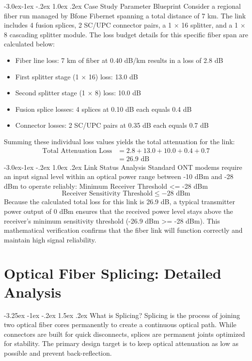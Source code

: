 \documentclass[11pt,a4paper]{report}
\makeatletter
\renewcommand{\section}{\@startsection{section}{1}{\z@}%
  {-3.25ex \@plus -1ex \@minus -.2ex}%
  {1.5ex \@plus.2ex}%
  {\normalfont\Large\bfseries\color{primaryColor}}}
\renewcommand{\subsection}{\@startsection{subsection}{2}{\z@}%
  {-3.0ex\@plus -1ex \@minus -.2ex}%
  {1.0ex \@plus .2ex}%
  {\normalfont\large\bfseries\color{secondaryColor}}}
\makeatother
\begin{document}
\subsection{Case Study Parameter Blueprint}
Consider a regional fiber run managed by Bfone Fibernet spanning a total distance of 7 km. The link includes 4 fusion splices, 2 SC/UPC connector pairs, a 1 $\times$ 16 splitter, and a 1 $\times$ 8 cascading splitter module. The loss budget details for this specific fiber span are calculated below:
\begin{itemize}
  \item Fiber line loss: 7 km of fiber at 0.40 dB/km results in a loss of 2.8 dB
  \item First splitter stage (1 $\times$ 16) loss: 13.0 dB
  \item Second splitter stage (1 $\times$ 8) loss: 10.0 dB
  \item Fusion splice losses: 4 splices at 0.10 dB each equals 0.4 dB
  \item Connector losses: 2 SC/UPC pairs at 0.35 dB each equals 0.7 dB
\end{itemize}
Summing these individual loss values yields the total attenuation for the link:
\begin{align*} \text{Total Attenuation Loss} &= 2.8 + 13.0 + 10.0 + 0.4 + 0.7 \\ &= 26.9\text{ dB} \end{align*}
\subsection{Link Status Analysis}
Standard ONT modems require an input signal level within an optical power range between -10 dBm and -28 dBm to operate reliably: Minimum Receiver Threshold <= -28 dBm
\begin{equation}\text{Receiver Sensitivity Threshold} \le -28\text{ dBm}\end{equation}
Because the calculated total loss for this link is 26.9 dB, a typical transmitter power output of 0 dBm ensures that the received power level stays above the receiver's minimum sensitivity threshold (-26.9 dBm >= -28 dBm). This mathematical verification confirms that the fiber link will function correctly and maintain high signal reliability.
\chapter{Optical Fiber Splicing: Detailed Analysis}
\section{What is Splicing?}
Splicing is the process of joining two optical fiber cores permanently to create a continuous optical path. While connectors are built for quick disconnects, splices are permanent joints optimized for stability. The primary design target is to keep optical attenuation as low as possible and prevent back-reflection.
\end{document}
